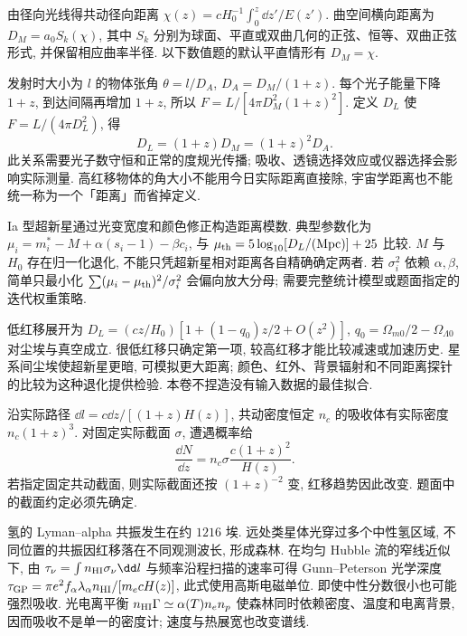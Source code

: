 \label{ch:distance}
由径向光线得共动径向距离 $\chi(z)=cH_0^{-1}\int_0^z\dd z'/E(z')$. 曲空间横向距离为 $D_M=a_0S_k(\chi)$, 其中 $S_k$ 分别为球面、平直或双曲几何的正弦、恒等、双曲正弦形式, 并保留相应曲率半径. 以下数值题的默认平直情形有 $D_M=\chi$.

发射时大小为 $l$ 的物体张角 $\theta=l/D_A$, $D_A=D_M/(1+z)$. 每个光子能量下降 $1+z$, 到达间隔再增加 $1+z$, 所以 $F=L/[4\pi D_M^2(1+z)^2]$. 定义 $D_L$ 使 $F=L/(4\pi D_L^2)$, 得
\begin{equation}\label{eq:distances}
D_L=(1+z)D_M=(1+z)^2D_A.
\end{equation}
此关系需要光子数守恒和正常的度规光传播; 吸收、透镜选择效应或仪器选择会影响实际测量. 高红移物体的角大小不能用今日实际距离直接除, 宇宙学距离也不能统一称为一个「距离」而省掉定义.

Ia 型超新星通过光变宽度和颜色修正构造距离模数. 典型参数化为 $\mu_i=m_i^*-M+\alpha(s_i-1)-\beta c_i$, 与 $\mu_{\rm th}=5\log_{10}[D_L/(\mathrm{Mpc})]+25$ 比较. $M$ 与 $H_0$ 存在归一化退化, 不能只凭超新星相对距离各自精确确定两者. 若 $\sigma_i^2$ 依赖 $\alpha,\beta$, 简单只最小化 $\sum(\mu_i-\mu_{\rm th})^2/\sigma_i^2$ 会偏向放大分母; 需要完整统计模型或题面指定的迭代权重策略.

低红移展开为 $D_L=(cz/H_0)[1+(1-q_0)z/2+O(z^2)]$, $q_0=\Omega_{m0}/2-\Omega_{\Lambda0}$ 对尘埃与真空成立. 很低红移只确定第一项, 较高红移才能比较减速或加速历史. 星系间尘埃使超新星更暗, 可模拟更大距离; 颜色、红外、背景辐射和不同距离探针的比较为这种退化提供检验. 本卷不捏造没有输入数据的最佳拟合.

沿实际路径 $\dd l=c\dd z/[(1+z)H(z)]$, 共动密度恒定 $n_c$ 的吸收体有实际密度 $n_c(1+z)^3$. 对固定实际截面 $\sigma$, 遭遇概率给
\begin{equation}\label{eq:absorber}
\frac{\dd N}{\dd z}=n_c\sigma\frac{c(1+z)^2}{H(z)}.
\end{equation}
若指定固定共动截面, 则实际截面还按 $(1+z)^{-2}$ 变, 红移趋势因此改变. 题面中的截面约定必须先确定.

氢的 Lyman--alpha 共振发生在约 $1216$ 埃. 远处类星体光穿过多个中性氢区域, 不同位置的共振因红移落在不同观测波长, 形成森林. 在均匀 Hubble 流的窄线近似下, 由 $\tau_\nu=\int n_{\rm HI}\sigma_\nu\dd l$ 与频率沿程扫描的速率可得 Gunn--Peterson 光学深度
$\tau_{\rm GP}=\pi e^2f_\alpha\lambda_\alpha n_{\rm HI}/[m_ecH(z)]$, 此式使用高斯电磁单位. 即使中性分数很小也可能强烈吸收. 光电离平衡 $n_{\rm HI}\Gamma\simeq\alpha(T)n_en_p$ 使森林同时依赖密度、温度和电离背景, 因而吸收不是单一的密度计; 速度与热展宽也改变谱线.
